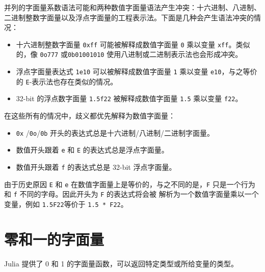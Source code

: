 并列的字面量系数语法可能和两种数值字面量语法产生冲突：十六进制、八进制、二进制整数字面量以及浮点字面量的工程表示法。下面是几种会产生语法冲突的情况：



\begin{itemize}
\item 十六进制整数字面量 \texttt{0xff} 可能被解释成数值字面量 \texttt{0} 乘以变量 \texttt{xff}。类似的，像 \texttt{0o777} 或\texttt{0b01001010} 使用八进制或二进制表示法也会形成冲突。


\item 浮点字面量表达式 \texttt{1e10} 可以被解释成数值字面量 \texttt{1} 乘以变量 \texttt{e10}，与之等价的 \texttt{E}-表示法也存在类似的情况。


\item 32-bit 的浮点数字面量 \texttt{1.5f22} 被解释成数值字面量 \texttt{1.5} 乘以变量 \texttt{f22}。

\end{itemize}


在这些所有的情况中，歧义都优先解释为数值字面量：



\begin{itemize}
\item \texttt{0x} /\texttt{0o}/\texttt{0b} 开头的表达式总是十六进制/八进制/二进制字面量。


\item 数值开头跟着 \texttt{e} 和 \texttt{E} 的表达式总是浮点字面量。


\item 数值开头跟着 \texttt{f} 的表达式总是 32-bit 浮点字面量。

\end{itemize}


由于历史原因 \texttt{E} 和 \texttt{e} 在数值字面量上是等价的，与之不同的是，\texttt{F} 只是一个行为和 \texttt{f} 不同的字母。因此开头为 \texttt{F} 的表达式将会被 解析为一个数值字面量乘以一个变量，例如 \texttt{1.5F22}等价于 \texttt{1.5 * F22}。



\hypertarget{15171481192117197140}{}


\section{零和一的字面量}



Julia 提供了 0 和 1 的字面量函数，可以返回特定类型或所给变量的类型。




